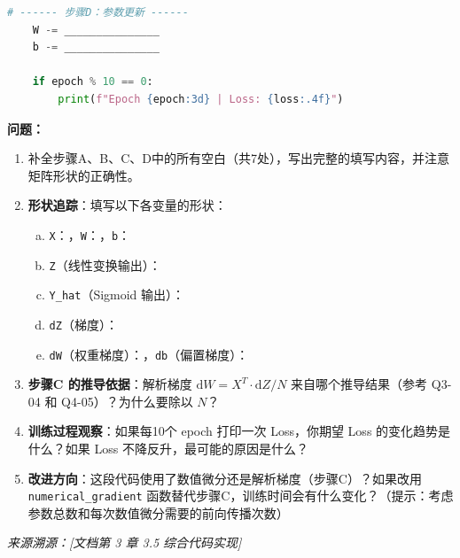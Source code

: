 \documentclass[a4paper,11pt]{ctexart}
\begin{document}
\begin{problembox}
\begin{lstlisting}[language=Python]
    # ------ 步骤D：参数更新 ------
    W -= _______________
    b -= _______________

    if epoch % 10 == 0:
        print(f"Epoch {epoch:3d} | Loss: {loss:.4f}")
    \end{lstlisting}

    \textbf{问题：}
    \begin{enumerate}[(1)]
        \item 补全步骤A、B、C、D中的所有空白（共7处），写出完整的填写内容，并注意矩阵形状的正确性。

        \item \textbf{形状追踪}：填写以下各变量的形状：
        \begin{enumerate}[a.]
            \item \texttt{X}：\underline{\hspace{3cm}}，\texttt{W}：\underline{\hspace{3cm}}，\texttt{b}：\underline{\hspace{3cm}}
            \item \texttt{Z}（线性变换输出）：\underline{\hspace{3cm}}
            \item \texttt{Y\_hat}（Sigmoid 输出）：\underline{\hspace{3cm}}
            \item \texttt{dZ}（梯度）：\underline{\hspace{3cm}}
            \item \texttt{dW}（权重梯度）：\underline{\hspace{3cm}}，\texttt{db}（偏置梯度）：\underline{\hspace{3cm}}
        \end{enumerate}

        \item \textbf{步骤C 的推导依据}：解析梯度 $\mathrm{d}W = X^T \cdot \mathrm{d}Z / N$ 来自哪个推导结果（参考 Q3-04 和 Q4-05）？为什么要除以 $N$？

        \item \textbf{训练过程观察}：如果每10个 epoch 打印一次 Loss，你期望 Loss 的变化趋势是什么？如果 Loss 不降反升，最可能的原因是什么？

        \item \textbf{改进方向}：这段代码使用了数值微分还是解析梯度（步骤C）？如果改用 \texttt{numerical\_gradient} 函数替代步骤C，训练时间会有什么变化？（提示：考虑参数总数和每次数值微分需要的前向传播次数）
    \end{enumerate}

    \vspace{0.2cm}
    {\color{gray}\small\textit{来源溯源：[文档第 3 章 3.5 综合代码实现]}}
\end{problembox}
\end{document}
